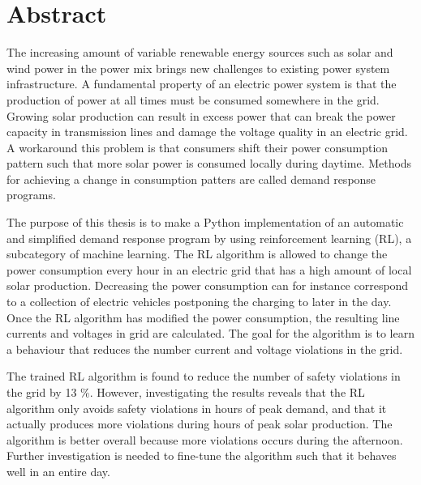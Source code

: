\documentclass[class=book, crop=false, 11pt]{standalone}
\begin{document}
\chapter{Abstract}
The increasing amount of variable renewable energy sources such as solar and wind power in the power mix brings new challenges to existing power system infrastructure. A fundamental property of an electric power system is that the production of power at all times must be consumed somewhere in the grid. Growing solar production can result in excess power that can break the power capacity in transmission lines and damage the voltage quality in an electric grid. A workaround this problem is that consumers shift their power consumption pattern such that more solar power is consumed locally during daytime. Methods for achieving a change in consumption patters are called demand response programs.

The purpose of this thesis is to make a Python implementation of an automatic and simplified demand response program by using reinforcement learning (RL), a subcategory of machine learning. The RL algorithm is allowed to change the power consumption every hour in an electric grid that has a high amount of local solar production. Decreasing the power consumption can for instance correspond to a collection of electric vehicles postponing the charging to later in the day. Once the RL algorithm has modified the power consumption, the resulting line currents and voltages in grid are calculated. The goal for the algorithm is to learn a behaviour that reduces the number current and voltage violations in the grid.

The trained RL algorithm is found to reduce the number of safety violations in the grid by 13 \%. However, investigating the results reveals that the RL algorithm only avoids safety violations in hours of peak demand, and that it actually produces more violations during hours of peak solar production. The algorithm is better overall because more violations occurs during the afternoon. Further investigation is needed to fine-tune the algorithm such that it behaves well in an entire day.
\end{document}
